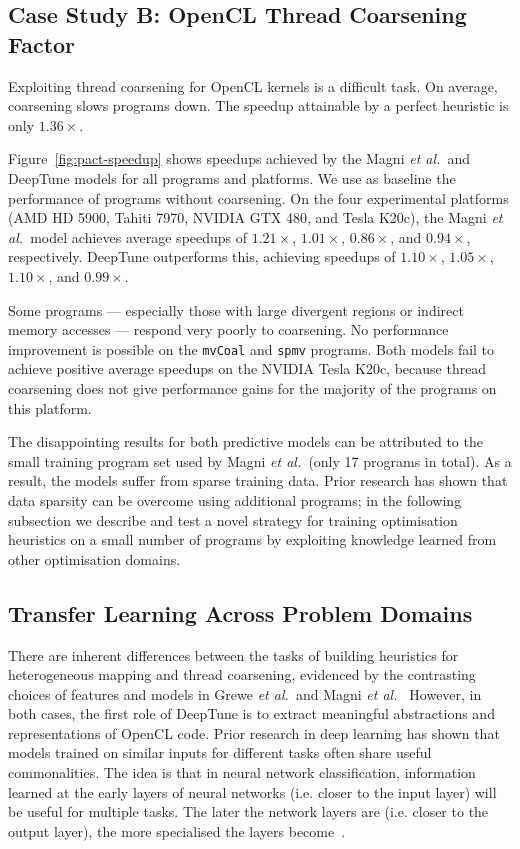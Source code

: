



\subsection{Case Study B: OpenCL Thread Coarsening Factor}



Exploiting thread coarsening for OpenCL kernels is a difficult task. On average, coarsening slows programs down. The speedup attainable by a perfect heuristic is only $1.36\times$.

Figure~\ref{fig:pact-speedup} shows speedups achieved by the Magni \emph{et al.\ }and DeepTune models for all programs and platforms. We use as baseline the performance of programs without coarsening.  On the four experimental platforms (AMD HD 5900, Tahiti 7970, NVIDIA GTX 480, and Tesla K20c), the Magni \emph{et al.\ }model achieves average speedups of $1.21\times$, $1.01\times$, $0.86\times$, and $0.94\times$, respectively. DeepTune outperforms this, achieving speedups of $1.10\times$, $1.05\times$, $1.10\times$, and $0.99\times$.

Some programs --- especially those with large divergent regions or indirect memory accesses --- respond very poorly to coarsening. No performance improvement is possible on the \texttt{mvCoal} and \texttt{spmv} programs. Both models fail to achieve positive average speedups on the NVIDIA Tesla K20c, because thread coarsening does not give performance gains for the majority of the programs on this platform.

The disappointing results for both predictive models can be attributed to the small training program set used by Magni \emph{et al.\ }(only 17 programs in total). As a result, the models suffer from sparse training data. Prior research has shown that data sparsity can be overcome using additional programs; in the following subsection we describe and test a novel strategy for training optimisation heuristics on a small number of programs by exploiting knowledge learned from other optimisation domains.


\subsection{Transfer Learning Across Problem Domains}\label{subsec:tl}

There are inherent differences between the tasks of building heuristics for heterogeneous mapping and thread coarsening, evidenced by the contrasting choices of features and models in Grewe \emph{et al.\ }and Magni \emph{et al.\ } However, in both cases, the first role of DeepTune is to extract meaningful abstractions and representations of OpenCL code. Prior research in deep learning has shown that models trained on similar inputs for different tasks often share useful commonalities. The idea is that in neural network classification, information learned at the early layers of neural networks (i.e. closer to the input layer) will be useful for multiple tasks. The later the network layers are (i.e. closer to the output layer), the more specialised the layers become~\cite{Zeiler2014}.

